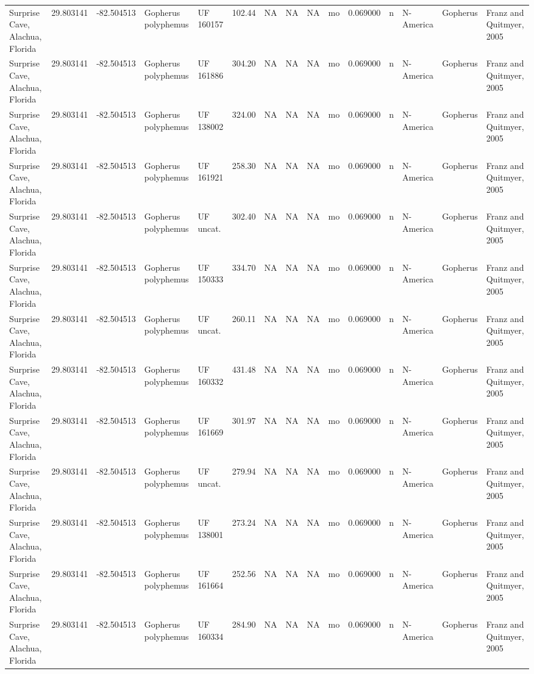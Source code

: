 \documentclass[]{article}
\begin{document}
\begin{longtable}[]{@{}lrrllrrrllrllll@{}}
Surprise Cave, Alachua, Florida & 29.803141 & -82.504513 & Gopherus
polyphemus & UF 160157 & 102.44 & NA & NA & NA & mo & 0.069000 & n &
N-America & Gopherus & Franz and Quitmyer, 2005\tabularnewline
Surprise Cave, Alachua, Florida & 29.803141 & -82.504513 & Gopherus
polyphemus & UF 161886 & 304.20 & NA & NA & NA & mo & 0.069000 & n &
N-America & Gopherus & Franz and Quitmyer, 2005\tabularnewline
Surprise Cave, Alachua, Florida & 29.803141 & -82.504513 & Gopherus
polyphemus & UF 138002 & 324.00 & NA & NA & NA & mo & 0.069000 & n &
N-America & Gopherus & Franz and Quitmyer, 2005\tabularnewline
Surprise Cave, Alachua, Florida & 29.803141 & -82.504513 & Gopherus
polyphemus & UF 161921 & 258.30 & NA & NA & NA & mo & 0.069000 & n &
N-America & Gopherus & Franz and Quitmyer, 2005\tabularnewline
Surprise Cave, Alachua, Florida & 29.803141 & -82.504513 & Gopherus
polyphemus & UF uncat. & 302.40 & NA & NA & NA & mo & 0.069000 & n &
N-America & Gopherus & Franz and Quitmyer, 2005\tabularnewline
Surprise Cave, Alachua, Florida & 29.803141 & -82.504513 & Gopherus
polyphemus & UF 150333 & 334.70 & NA & NA & NA & mo & 0.069000 & n &
N-America & Gopherus & Franz and Quitmyer, 2005\tabularnewline
Surprise Cave, Alachua, Florida & 29.803141 & -82.504513 & Gopherus
polyphemus & UF uncat. & 260.11 & NA & NA & NA & mo & 0.069000 & n &
N-America & Gopherus & Franz and Quitmyer, 2005\tabularnewline
Surprise Cave, Alachua, Florida & 29.803141 & -82.504513 & Gopherus
polyphemus & UF 160332 & 431.48 & NA & NA & NA & mo & 0.069000 & n &
N-America & Gopherus & Franz and Quitmyer, 2005\tabularnewline
Surprise Cave, Alachua, Florida & 29.803141 & -82.504513 & Gopherus
polyphemus & UF 161669 & 301.97 & NA & NA & NA & mo & 0.069000 & n &
N-America & Gopherus & Franz and Quitmyer, 2005\tabularnewline
Surprise Cave, Alachua, Florida & 29.803141 & -82.504513 & Gopherus
polyphemus & UF uncat. & 279.94 & NA & NA & NA & mo & 0.069000 & n &
N-America & Gopherus & Franz and Quitmyer, 2005\tabularnewline
Surprise Cave, Alachua, Florida & 29.803141 & -82.504513 & Gopherus
polyphemus & UF 138001 & 273.24 & NA & NA & NA & mo & 0.069000 & n &
N-America & Gopherus & Franz and Quitmyer, 2005\tabularnewline
Surprise Cave, Alachua, Florida & 29.803141 & -82.504513 & Gopherus
polyphemus & UF 161664 & 252.56 & NA & NA & NA & mo & 0.069000 & n &
N-America & Gopherus & Franz and Quitmyer, 2005\tabularnewline
Surprise Cave, Alachua, Florida & 29.803141 & -82.504513 & Gopherus
polyphemus & UF 160334 & 284.90 & NA & NA & NA & mo & 0.069000 & n &
N-America & Gopherus & Franz and Quitmyer, 2005\tabularnewline

\end{longtable}
\end{document}
